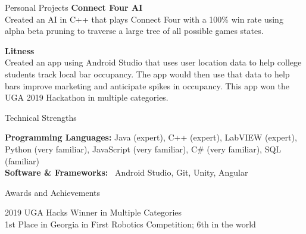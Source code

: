 \documentclass{resume} %
\begin{document}
\begin{rSection}{Personal Projects}
{\bf Connect Four AI}\\
{ Created an AI in C++ that plays Connect Four with a 100\% win rate using alpha beta pruning to traverse a large tree of all possible games states. }

{\bf Litness}\\
{ Created an app using Android Studio that uses user location data to help college students track local bar occupancy. The app would then use that data to help bars improve marketing and anticipate spikes in occupancy. This app won the UGA 2019 Hackathon in multiple categories.}

\end{rSection}

\begin{rSection}{Technical Strengths}

{\bf Programming Languages:} Java (expert), C++ (expert), LabVIEW (expert), Python (very familiar), JavaScript (very familiar), C\# (very familiar), SQL (familiar) \\
{\bf Software \& Frameworks:} \ Android Studio, Git, Unity, Angular \\

\end{rSection}



\begin{rSection}{Awards and Achievements}

2019 UGA Hacks Winner in Multiple Categories \\
1st Place in Georgia in First Robotics Competition; 6th in the world \\

\end{rSection}
\end{document}
